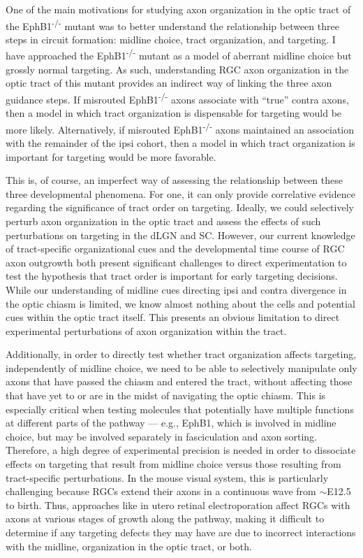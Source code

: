 \label{sec:LinkingEphB1}
One of the main motivations for studying axon organization in the optic tract of the EphB1\textsuperscript{-/-} mutant was to better understand the relationship between three steps in circuit formation: midline choice, tract organization, and targeting.
I have approached the EphB1\textsuperscript{-/-} mutant as a model of aberrant midline choice but grossly normal targeting.
As such, understanding RGC axon organization in the optic tract of this mutant provides an indirect way of linking the three axon guidance steps.
If misrouted EphB1\textsuperscript{-/-} axons associate with ``true'' contra axons, then a model in which tract organization is dispensable for targeting would be more likely.
Alternatively, if misrouted EphB1\textsuperscript{-/-} axons maintained an association with the remainder of the ipsi cohort, then a model in which tract organization is important for targeting would be more favorable.

This is, of course, an imperfect way of assessing the relationship between these three developmental phenomena. 
For one, it can only provide correlative evidence regarding the significance of tract order on targeting.
Ideally, we could selectively perturb axon organization in the optic tract and assess the effects of such perturbations on targeting in the dLGN and SC.
However, our current knowledge of tract-specific organizational cues and the developmental time course of RGC axon outgrowth both present significant challenges to direct experimentation to test the hypothesis that tract order is important for early targeting decisions.
While our understanding of midline cues directing ipsi and contra divergence in the optic chiasm is limited, we know almost nothing about the cells and potential cues within the optic tract itself.
This presents an obvious limitation to direct experimental perturbations of axon organization within the tract.

Additionally, in order to directly test whether tract organization affects targeting, independently of midline choice, we need to be able to selectively manipulate only axons that have passed the chiasm and entered the tract, without affecting those that have yet to or are in the midst of navigating the optic chiasm.
This is especially critical when testing molecules that potentially have multiple functions at different parts of the pathway --- e.g., EphB1, which is involved in midline choice, but may be involved separately in fasciculation and axon sorting. 
Therefore, a high degree of experimental precision is needed in order to dissociate effects on targeting that result from midline choice versus those resulting from tract-specific perturbations.
In the mouse visual system, this is particularly challenging because RGCs extend their axons in a continuous wave from $\sim$E12.5 to birth.
Thus, approaches like in utero retinal electroporation affect RGCs with axons at various stages of growth along the pathway, making it difficult to determine if any targeting defects they may have are due to incorrect interactions with the midline, organization in the optic tract, or both.

